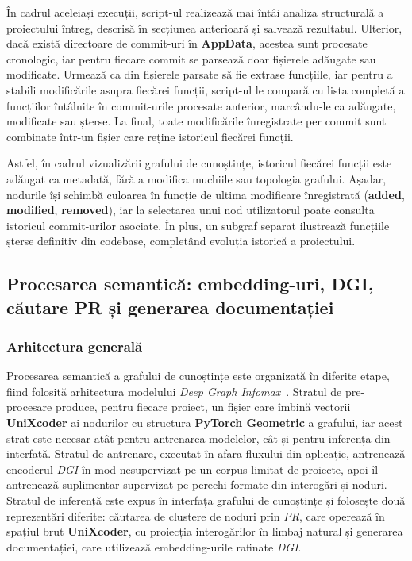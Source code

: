 \documentclass[12pt]{article}
\numberwithin{equation}{section}
\numberwithin{figure}{section}
\numberwithin{table}{section}
\theoremstyle{definition}
\theoremstyle{plain}
\begin{document}
În cadrul aceleiași execuții, script-ul realizează mai întâi analiza structurală a proiectului întreg, descrisă în secțiunea anterioară și salvează rezultatul. Ulterior, dacă există directoare de commit-uri în \textbf{AppData}, acestea sunt procesate cronologic, iar pentru fiecare commit se parsează doar fișierele adăugate sau modificate. Urmează ca din fișierele parsate să fie extrase funcțiile, iar pentru a  stabili modificările asupra fiecărei funcții, script-ul le compară cu lista completă a funcțiilor întâlnite în commit-urile procesate anterior, marcându-le ca adăugate, modificate sau șterse. La final, toate modificările înregistrate per commit sunt combinate într-un fișier care reține istoricul fiecărei funcții.

Astfel, în cadrul vizualizării grafului de cunoștințe, istoricul fiecărei funcții este adăugat ca metadată, fără a modifica muchiile sau topologia grafului. Așadar, nodurile își schimbă culoarea în funcție de ultima modificare înregistrată (\textbf{added}, \textbf{modified}, \textbf{removed}), iar la selectarea unui nod utilizatorul poate consulta istoricul commit-urilor asociate. În plus, un subgraf separat ilustrează funcțiile șterse definitiv din codebase, completând evoluția istorică a proiectului.

\subsection{Procesarea semantică: embedding-uri, DGI, căutare PR și generarea documentației}

\subsubsection{Arhitectura generală}

Procesarea semantică a grafului de cunoștințe este organizată în diferite etape, fiind folosită arhitectura modelului \textit{Deep Graph Infomax}~\cite{velickovic2019dgi}. Stratul de pre-procesare produce, pentru fiecare proiect, un fișier care îmbină vectorii \textbf{UniXcoder} ai nodurilor cu structura \textbf{PyTorch Geometric} a grafului, iar acest strat este necesar atât pentru antrenarea modelelor, cât și pentru inferența din interfață. Stratul de antrenare, executat în afara fluxului din aplicație, antrenează encoderul \textit{DGI} în mod nesupervizat pe un corpus limitat de proiecte, apoi îl antrenează suplimentar supervizat pe perechi formate din interogări și noduri. Stratul de inferență este expus în interfața grafului de cunoștințe și folosește două reprezentări diferite: căutarea de clustere de noduri prin \textit{PR}, care operează în spațiul brut \textbf{UniXcoder}, cu proiecția interogărilor în limbaj natural și generarea documentației, care utilizează embedding-urile rafinate \textit{DGI}.
\end{document}
